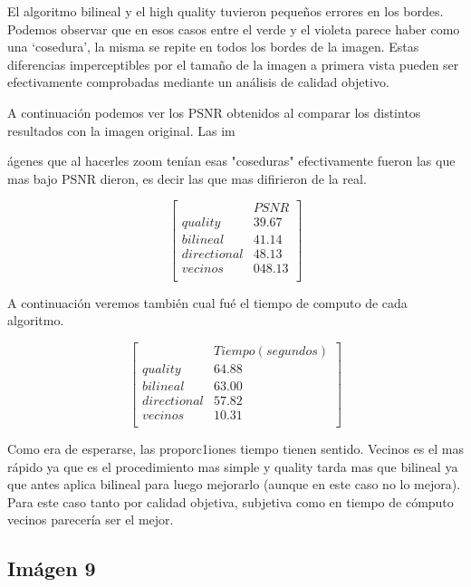 El algoritmo bilineal y el high quality tuvieron pequeños errores en los bordes. Podemos observar que en esos casos entre el verde y el violeta parece haber como una `cosedura', la misma se repite en todos los bordes de la imagen. Estas diferencias imperceptibles por el tamaño de la imagen a primera vista pueden ser efectivamente comprobadas mediante un análisis de calidad objetivo. 

A continuación podemos ver los PSNR obtenidos al comparar los distintos resultados con la imagen original. Las im{ágenes que al hacerles zoom tenían esas "coseduras" efectivamente fueron las que mas bajo PSNR dieron, es decir las que mas difirieron de la real.

$$ 
\begin{bmatrix}
           &      PSNR     \\
       quality    &   39.67   \\
       bilineal    &      41.14   \\
       directional    &      48.13    \\
       vecinos   &      048.13      \\
\end{bmatrix} 
$$

A continuación veremos también cual fué el tiempo de computo de cada algoritmo.

$$ 
\begin{bmatrix}
           &      Tiempo (segundos)     \\
       quality    &   64.88   \\
       bilineal    &      63.00   \\
       directional    &      57.82    \\
       vecinos   &      10.31      \\
\end{bmatrix} 
$$

Como era de esperarse, las proporc1iones tiempo tienen sentido. Vecinos es el mas rápido ya que es el procedimiento mas simple y quality tarda mas que bilineal ya que antes aplica bilineal para luego mejorarlo (aunque en este caso no lo mejora). Para este caso tanto por calidad objetiva, subjetiva como en tiempo de cómputo vecinos parecería ser el mejor.


\newpage

\subsection{Imágen 9}

}
